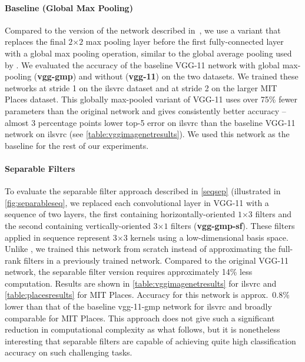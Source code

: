 \documentclass[thesis]{subfiles}
\begin{document}
    \paragraph{Baseline (Global Max Pooling)}  Compared to the version of the network described in~\citep{Simonyan2014verydeep}, we use a variant that replaces the final $2$$\times$$2$ max pooling layer before the first fully-connected layer with a global max pooling operation, similar to the global average pooling used by \citet{Lin2013NiN,Szegedy2014going}. We evaluated the accuracy of the baseline VGG-11 network with global max-pooling (\textbf{vgg-gmp}) and without (\textbf{vgg-11}) on the two datasets. We trained these networks at stride 1 on the \gls{ilsvrc} dataset and at stride 2 on the larger MIT Places dataset. This globally max-pooled variant of VGG-11 uses over 75\% fewer parameters than the original network and gives consistently better accuracy -- almost 3 percentage points lower top-5 error on \gls{ilsvrc} than the baseline VGG-11 network on \gls{ilsvrc} (see \cref{table:vggimagenetresults}). We used this network as the baseline for the rest of our experiments.
    
    
    \paragraph{Separable Filters} To evaluate the separable filter approach described in \cref{seqsep} (illustrated in \cref{fig:separableseq}, we replaced each convolutional layer in VGG-11 with a sequence of two layers, the first containing horizontally-oriented $1$$\times$$3$ filters and the second containing vertically-oriented $3$$\times$$1$ filters (\textbf{vgg-gmp-sf}). These filters applied in sequence represent $3$$\times$$3$ kernels using a low-dimensional basis space. Unlike \citet{journals/corr/JaderbergVZ14}, we trained this network from scratch instead of approximating the full-rank filters in a previously trained network. Compared to the original VGG-11 network, the separable filter version requires approximately 14\% less computation. Results are shown in \cref{table:vggimagenetresults} for \gls{ilsvrc} and \cref{table:placesresults} for MIT Places. Accuracy for this network is approx.~0.8\% lower than that of the baseline vgg-11-gmp network for \gls{ilsvrc} and broadly comparable for MIT Places. This approach does not give such a significant reduction in computational complexity as what follows, but it is nonetheless interesting that separable  filters are capable of achieving quite high classification accuracy on such challenging tasks.
    
\end{document}
